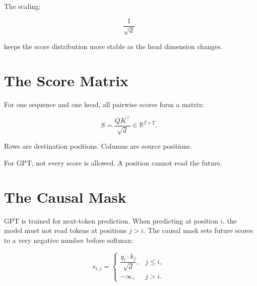 The scaling:

\[
\frac{1}{\sqrt d}
\]

keeps the score distribution more stable as the head dimension changes.

\section{The Score Matrix}

For one sequence and one head, all pairwise scores form a matrix:

\[
S=\frac{QK^\top}{\sqrt d}\in\mathbb{R}^{T\times T}.
\]

Rows are destination positions. Columns are source positions.

\begin{center}
\end{center}

For GPT, not every score is allowed. A position cannot read the future.

\section{The Causal Mask}

GPT is trained for next-token prediction. When predicting at position \(i\), the model must not read tokens at positions \(j>i\). The causal mask sets future scores to a very negative number before softmax:

\[
s_{i,j} =
\begin{cases}
\dfrac{q_i\cdot k_j}{\sqrt d}, & j\leq i,\\
-\infty, & j>i.
\end{cases}
\]

